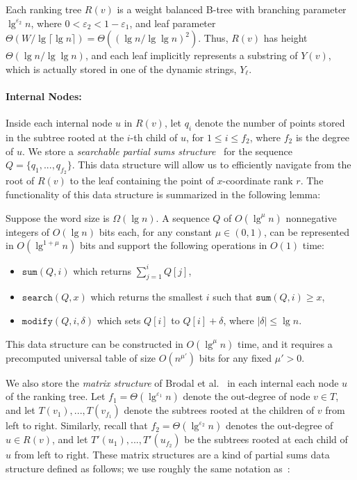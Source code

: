 \documentclass{llncs}
\def\idtt#1{\ensuremath{\mathtt{#1}}}
\begin{document}
Each ranking tree $R(v)$ is a weight balanced B-tree with branching
parameter $\lg^{\varepsilon_2}n$, where $0 < \varepsilon_2 < 1 -
\varepsilon_1$, and leaf parameter $\Theta(W/\lg\lceil \lg n\rceil) =
\Theta((\lg n / \lg \lg n)^2)$.  Thus, $R(v)$ has height $\Theta(\lg n
/ \lg \lg n)$, and each leaf implicitly represents a substring of
$Y(v)$, which is actually stored in one of the dynamic strings,
$Y_\ell$.

\paragraph{Internal Nodes:}
Inside each internal node $u$ in $R(v)$, let $q_i$ denote the number
of points stored in the subtree rooted at the $i$-th child of $u$, for
$1 \le i \le f_2$, where $f_2$ is the degree of $u$.  We store a
\emph{searchable partial sums structure}~\cite{RRR02} for the sequence
$Q = \{q_1, ..., q_{f_2} \}$.  This data structure will allow us to
efficiently navigate from the root of $R(v)$ to the leaf containing
the point of $x$-coordinate rank $r$.  The functionality of this data
structure is summarized in the following lemma:

\begin{lemma}\label{lem:RRR}
Suppose the word size is $\Omega(\lg n)$.  A sequence $Q$ of
$O(\lg^{\mu} n)$ nonnegative integers of $O(\lg n)$ bits each, for any
constant $\mu \in (0,1)$, can be represented in $O(\lg^{1+\mu}n)$ bits
and support the following operations in $O(1)$ time:
\begin{itemize}
\item $\idtt{sum}(Q,i)$ which returns $\sum_{j=1}^{i}Q[j]$,
\item $\idtt{search}(Q,x)$ which returns the smallest $i$ such that
  $\idtt{sum}(Q,i) \ge x$,
\item $\idtt{modify}(Q,i,\delta)$ which sets $Q[i]$ to
  $Q[i]+\delta$, where $|\delta| \le \lg n$.
\end{itemize}
This data structure can be constructed in $O(\lg^{\mu}n)$ time, and it
requires a precomputed universal table of size $O(n^{\mu'})$ bits for
any fixed $\mu' > 0$.
\end{lemma}

We also store the \emph{matrix structure} of Brodal et
al.~\cite{BGJS10} in each internal each node $u$ of the ranking tree.
Let $f_1 = \Theta(\lg^{\varepsilon_1}n)$ denote the out-degree of node
$v \in T$, and let $T(v_1), ..., T(v_{f_1})$ denote the subtrees
rooted at the children of $v$ from left to right.  Similarly, recall
that $f_2 = \Theta(\lg^{\varepsilon_2}n)$ denotes the out-degree of $u
\in R(v)$, and let $T'(u_1), ..., T'(u_{f_2})$ be the subtrees rooted
at each child of $u$ from left to right.  These matrix structures are
a kind of partial sums data structure defined as follows; we use
roughly the same notation as~\cite{BGJS10}:
\end{document}
